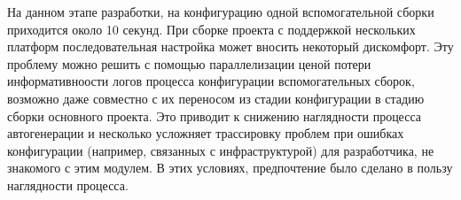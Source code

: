 \par
На данном этапе разработки, на конфигурацию одной вспомогательной сборки приходится около 10 секунд.
При сборке проекта с поддержкой нескольких платформ последовательная настройка может вносить некоторый дискомфорт.
Эту проблему можно решить с помощью параллелизации ценой потери информативноости логов процесса конфигурации вспомогательных сборок, возможно даже совместно с их переносом из стадии конфигурации в стадию сборки основного проекта.
Это приводит к снижению наглядности процесса автогенерации и несколько усложняет трассировку проблем при ошибках конфигурации (например, связанных с инфраструктурой) для разработчика, не знакомого с этим модулем.
В этих условиях, предпочтение было сделано в пользу наглядности процесса.


\newpage